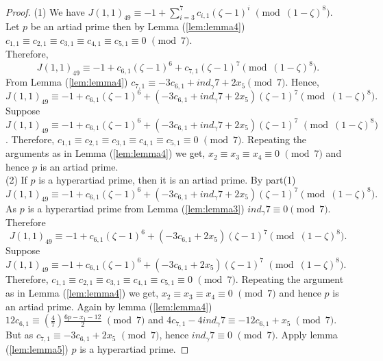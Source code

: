 \documentclass[10pt,a4paper]{amsart}
\def\vpmod{\!\!\!\pmod}
\begin{document}
\begin{proof}
(1) We have $J(1,1)_{49}\equiv -1 + \displaystyle{\sum_{i=3}^{7}c_{i,1}(\zeta -1)^i}\,\, \vpmod{(1-\zeta)^{8}}$.\\
 Let $p$ be an artiad prime then by Lemma (\ref{lem:lemma4}) $c_{1,1}\equiv c_{2,1}\equiv c_{3,1}\equiv c_{4,1}\equiv c_{5,1}\equiv 0\,\,\vpmod 7$.\\
 Therefore, \begin{equation*}\label{eq:20}
 J(1,1)_{49}\equiv -1 +c_{6,1}(\zeta -1)^6+c_{7,1}(\zeta -1)^7 \vpmod{(1-\zeta)^{8}}.
             \end{equation*}
From Lemma (\ref{lem:lemma4}) $c_{7,1}\equiv-3c_{6,1}+ind_{\gamma}7+2x_{5}\vpmod 7.$
Hence, 
 $$J(1,1)_{49}\equiv -1 +c_{6,1}(\zeta -1)^6+(-3c_{6,1}+ind_{\gamma}7+2x_{5})(\zeta -1)^7 \vpmod{(1-\zeta)^{8}}.$$
\noindent Suppose $J(1,1)_{49}\equiv -1 +c_{6,1}(\zeta -1)^6+(-3c_{6,1}+ind_{\gamma}7+2x_{5})(\zeta -1)^7\,\, \vpmod{(1-\zeta)^{8}}$.
 Therefore, $c_{1,1}\equiv c_{2,1}\equiv c_{3,1} \equiv c_{4,1}\equiv c_{5,1}\equiv 0\,\,\vpmod 7$. Repeating the arguments as in Lemma (\ref{lem:lemma4})
 we get, $x_{2}\equiv x_{3}\equiv x_{4}\equiv 0\,\,\vpmod 7$ and hence $p$ is an artiad prime.\\
(2) If $p$ is a hyperartiad prime, then it is an artiad prime. By part(1) $$J(1,1)_{49}\equiv -1 +c_{6,1}(\zeta -1)^6+(-3c_{6,1}+ind_{\gamma}7+2x_{5})(\zeta -1)^7 \vpmod{(1-\zeta)^{8}}.$$
As $p$ is a hyperartiad prime from Lemma (\ref{lem:lemma3}) $ind_{\gamma}7\equiv 0\vpmod7$. Therefore
\begin{equation*}\label{eq29}
J(1,1)_{49}\equiv -1 +c_{6,1}(\zeta -1)^6+(-3c_{6,1}+2x_{5})(\zeta -1)^7 \vpmod{(1-\zeta)^{8}}.
\end{equation*}
\noindent Suppose $J(1,1)_{49}\equiv -1 +c_{6,1}(\zeta -1)^6+(-3c_{6,1}+2x_{5})(\zeta -1)^7\,\, \vpmod{(1-\zeta)^{8}}$. 
Therefore, $c_{1,1}\equiv c_{2,1}\equiv c_{3,1} \equiv c_{4,1}\equiv c_{5,1}\equiv 0\,\,\vpmod 7$. Repeating the argument as in Lemma (\ref{lem:lemma4}) we get, $x_{2}\equiv x_{3}\equiv x_{4}\equiv 0\,\,\vpmod 7$ and hence $p$ is an artiad prime.
Again by lemma (\ref{lem:lemma4}) $12c_{6,1}\equiv (\frac{4}{7})\frac{6p-x_{1}-12}{2}\,\,\vpmod7$ and $4c_{7,1}-4ind_{\gamma}7\equiv-12c_{6,1}+x_{5}\,\,\vpmod7$.
But as $c_{7,1}\equiv-3c_{6,1}+2x_{5}\,\,\vpmod 7$, hence $ind_{\gamma}7\equiv 0\,\,\vpmod7$. Apply lemma (\ref{lem:lemma5}) $p$ is a hyperartiad prime.
 \end{proof}
\end{document}
